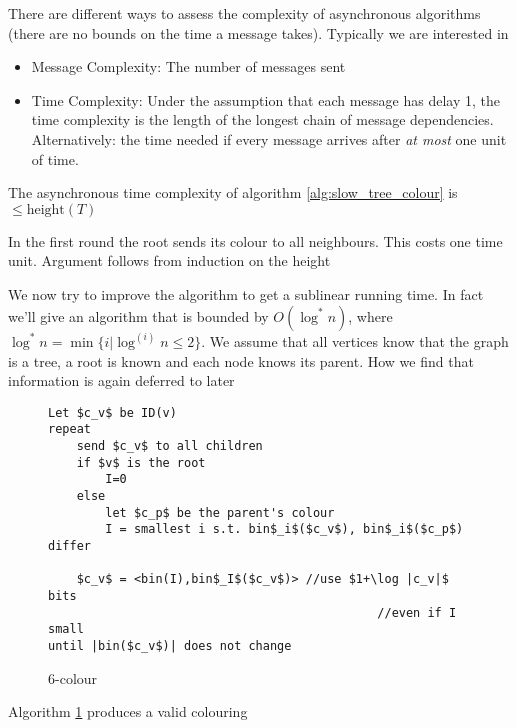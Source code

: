There are different ways to assess the complexity of asynchronous algorithms (there are no bounds on the time a message takes). Typically we are interested in 

\begin{itemize}
\item Message Complexity: The number of messages sent
\item Time Complexity: Under the assumption that each message has delay 1, the time complexity is the length of the longest chain of message dependencies. Alternatively: the time needed if every message arrives after \emph{at most} one unit of time.
\end{itemize}

\begin{thm} The asynchronous time complexity of algorithm \ref{alg:slow_tree_colour} is $\leq \text{height}(T)$ \end{thm}
\begin{pr} In the first round the root sends its colour to all neighbours. This costs one time unit. Argument follows from induction on the height\end{pr}

We now try to improve the algorithm to get a sublinear running time. In fact we'll give an algorithm that is bounded by $O(\log^*n)$, where $\log^* n = \min \{i|\log^{(i)} n \leq 2\}$. We assume that all vertices know that the graph is a tree, a root is known and each node knows its parent. How we find that information is again deferred to later

\begin{figure}[hbt]
\begin{lstlisting}
Let $c_v$ be ID(v)
repeat 
	send $c_v$ to all children
	if $v$ is the root
		I=0
	else 
		let $c_p$ be the parent's colour
		I = smallest i s.t. bin$_i$($c_v$), bin$_i$($c_p$) differ
		
	$c_v$ = <bin(I),bin$_I$($c_v$)> //use $1+\log |c_v|$ bits  
											  //even if I small
until |bin($c_v$)| does not change
\end{lstlisting}
\caption{6-colour}
\label{alg:6-colour}
\end{figure}

\begin{lem} Algorithm \ref{alg:6-colour} produces a valid colouring \end{lem}

